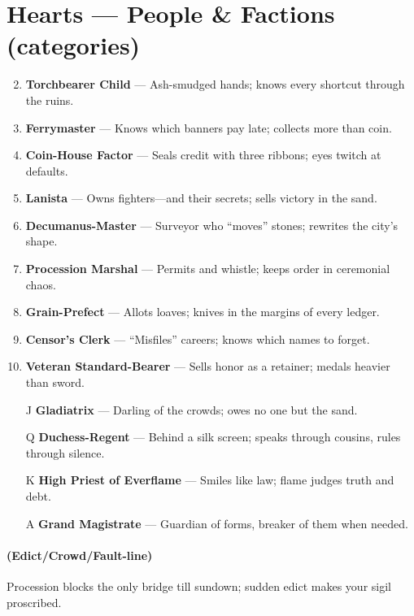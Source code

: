 \section*{Hearts --- People \& Factions (categories)}
\label{sec:ecktoria-people}
\begin{enumerate}
\setcounter{enumi}{1}
\item \textbf{Torchbearer Child} --- Ash-smudged hands; knows every shortcut through the ruins.
\item \textbf{Ferrymaster} --- Knows which banners pay late; collects more than coin.
\item \textbf{Coin-House Factor} --- Seals credit with three ribbons; eyes twitch at defaults.
\item \textbf{Lanista} --- Owns fighters---and their secrets; sells victory in the sand.
\item \textbf{Decumanus-Master} --- Surveyor who ``moves'' stones; rewrites the city's shape.
\item \textbf{Procession Marshal} --- Permits and whistle; keeps order in ceremonial chaos.
\item \textbf{Grain-Prefect} --- Allots loaves; knives in the margins of every ledger.
\item \textbf{Censor's Clerk} --- ``Misfiles'' careers; knows which names to forget.
\item \textbf{Veteran Standard-Bearer} --- Sells honor as a retainer; medals heavier than sword.
\item[J] \textbf{Gladiatrix} --- Darling of the crowds; owes no one but the sand.
\item[Q] \textbf{Duchess-Regent} --- Behind a silk screen; speaks through cousins, rules through silence.
\item[K] \textbf{High Priest of Everflame} --- Smiles like law; flame judges truth and debt.
\item[A] \textbf{Grand Magistrate} --- Guardian of forms, breaker of them when needed.
\end{enumerate}

\paragraph*{(Edict/Crowd/Fault-line)} Procession blocks the only bridge till sundown; sudden edict makes your sigil proscribed.

